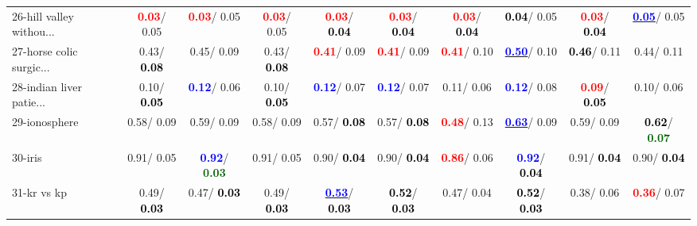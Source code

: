 \begin{table}[h]
\begin{center}
{\begin{tabular}{lc|c|c|c|c|c|c|c|c}
26-hill valley withou... & \textcolor{red}{\textbf{  0.03}}/  0.05 & \textcolor{red}{\textbf{  0.03}}/  0.05 & \textcolor{red}{\textbf{  0.03}}/  0.05 & \textcolor{red}{\textbf{  0.03}}/\textcolor{black}{\textbf{  0.04}} & \textcolor{red}{\textbf{  0.03}}/\textcolor{black}{\textbf{  0.04}} & \textcolor{red}{\textbf{  0.03}}/\textcolor{black}{\textbf{  0.04}} & \textcolor{black}{\textbf{  0.04}}/  0.05 & \textcolor{red}{\textbf{  0.03}}/\textcolor{black}{\textbf{  0.04}} & \underline{\textcolor{blue}{\textbf{  0.05}}}/  0.05 \\
27-horse colic surgic... &   0.43/\textcolor{black}{\textbf{  0.08}} &   0.45/  0.09 &   0.43/\textcolor{black}{\textbf{  0.08}} & \textcolor{red}{\textbf{  0.41}}/  0.09 & \textcolor{red}{\textbf{  0.41}}/  0.09 & \textcolor{red}{\textbf{  0.41}}/  0.10 & \underline{\textcolor{blue}{\textbf{  0.50}}}/  0.10 & \textcolor{black}{\textbf{  0.46}}/  0.11 &   0.44/  0.11 \\
28-indian liver patie... &   0.10/\textcolor{black}{\textbf{  0.05}} & \textcolor{blue}{\textbf{  0.12}}/  0.06 &   0.10/\textcolor{black}{\textbf{  0.05}} & \textcolor{blue}{\textbf{  0.12}}/  0.07 & \textcolor{blue}{\textbf{  0.12}}/  0.07 &   0.11/  0.06 & \textcolor{blue}{\textbf{  0.12}}/  0.08 & \textcolor{red}{\textbf{  0.09}}/\textcolor{black}{\textbf{  0.05}} &   0.10/  0.06 \\ \hline
29-ionosphere &   0.58/  0.09 &   0.59/  0.09 &   0.58/  0.09 &   0.57/\textcolor{black}{\textbf{  0.08}} &   0.57/\textcolor{black}{\textbf{  0.08}} & \textcolor{red}{\textbf{  0.48}}/  0.13 & \underline{\textcolor{blue}{\textbf{  0.63}}}/  0.09 &   0.59/  0.09 & \textcolor{black}{\textbf{  0.62}}/\textcolor{darkgreen}{\textbf{  0.07}} \\
30-iris &   0.91/  0.05 & \textcolor{blue}{\textbf{  0.92}}/\textcolor{darkgreen}{\textbf{  0.03}} &   0.91/  0.05 &   0.90/\textcolor{black}{\textbf{  0.04}} &   0.90/\textcolor{black}{\textbf{  0.04}} & \textcolor{red}{\textbf{  0.86}}/  0.06 & \textcolor{blue}{\textbf{  0.92}}/\textcolor{black}{\textbf{  0.04}} &   0.91/\textcolor{black}{\textbf{  0.04}} &   0.90/\textcolor{black}{\textbf{  0.04}} \\
31-kr vs kp &   0.49/\textcolor{black}{\textbf{  0.03}} &   0.47/\textcolor{black}{\textbf{  0.03}} &   0.49/\textcolor{black}{\textbf{  0.03}} & \underline{\textcolor{blue}{\textbf{  0.53}}}/\textcolor{black}{\textbf{  0.03}} & \textcolor{black}{\textbf{  0.52}}/\textcolor{black}{\textbf{  0.03}} &   0.47/  0.04 & \textcolor{black}{\textbf{  0.52}}/\textcolor{black}{\textbf{  0.03}} &   0.38/  0.06 & \textcolor{red}{\textbf{  0.36}}/  0.07 \\

\end{tabular}}
\end{center}
\end{table}
